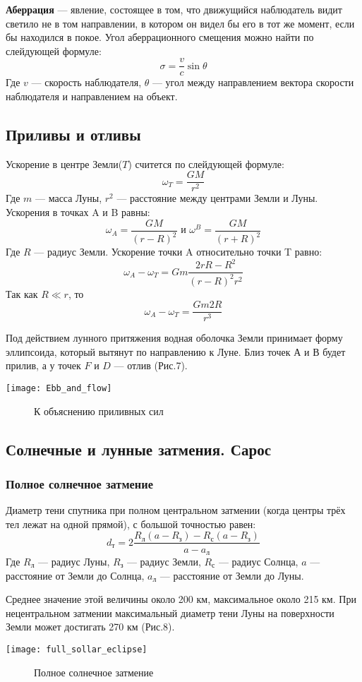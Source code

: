 \documentclass[10pt,a5paper]{article}
\begin{document}
\textbf{Аберрация} --- явление, состоящее в том, что движущийся наблюдатель видит светило не в том направлении, в котором он видел бы его в тот же момент, если бы находился в покое. 
Угол аберрационного смещения можно найти по слейдующей формуле:
$$\sigma=\frac{v}{c}\sin\theta$$
Где $v$ --- скорость наблюдателя, $\theta$ --- угол между направлением вектора скорости наблюдателя и направлением на объект.
\subsection{Приливы и отливы}
Ускорение в центре Земли($T$) считется по слейдующей формуле: $$\omega_T=\frac{GM}{r^2}$$
Где $m$ --- масса Луны, $r^2$ --- расстояние между центрами Земли и Луны. Ускорения в точках A и B равны:
$$\omega_A=\frac{GM}{(r-R)^2} \text{ и } \omega^B=\frac{GM}{(r+R)^2}$$
Где $R$ --- радиус Земли. Ускорение точки A относительно точки T равно:
$$\omega_A-\omega_T=Gm\frac{2rR-R^2}{(r-R)^2r^2}$$
Так как $R\ll r$, то $$\omega_A-\omega_T=\frac{Gm2R}{r^3}$$

Под действием лунного притяжения водная оболочка Земли принимает форму эллипсоида, который вытянут по направлению к Луне. Близ точек $А$ и $В$ будет прилив, а у точек $F$ и $D$ --- отлив (Рис.7).
\begin{center}
\texttt{[image: Ebb\_and\_flow]}
\begin{figure}[h!]
\caption{К объяснению приливных сил}
\end{figure}
\end{center}
\subsection{Солнечные и лунные затмения. Сарос}
\subsubsection{Полное солнечное затмение}
Диаметр тени спутника при полном центральном затмении (когда центры трёх тел лежат на одной прямой), с большой точностью равен:
$$d_\text{т}=2\frac{R_\text{л}(a-R_\text{з})-R_\text{с}(a-R_\text{з})}{a-a_\text{л}}$$
Где $R_\text{л}$ --- радиус Луны, $R_\text{з}$ --- радиус Земли, $R_\text{с}$ --- радиус Солнца, $a$ --- расстояние от Земли до Солнца, $a_\text{л}$ --- расстояние от Земли до Луны.

Среднее значение  этой величины около 200 км, максимальное около 215 км. При нецентральном затмении максимальный диаметр тени Луны на поверхности Земли может достигать 270 км (Рис.8).
\begin{center}
\texttt{[image: full\_sollar\_eclipse]}
\begin{figure}[h!]
\caption{Полное солнечное затмение}
\end{figure}
\end{center}
\end{document}
